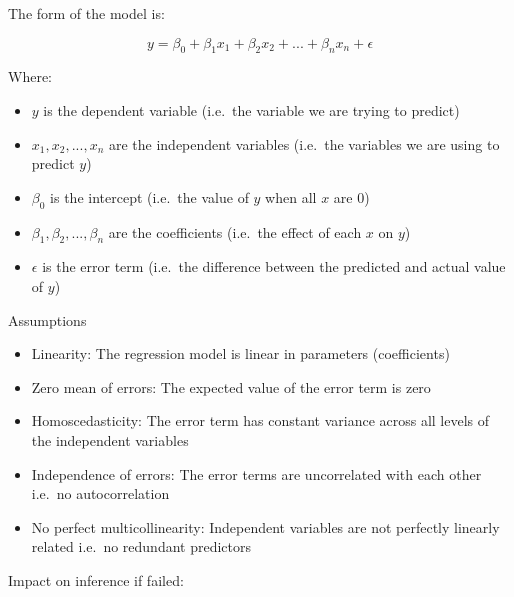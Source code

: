 \documentclass[
  number]{elsarticle}
\begin{document}
\begin{tcolorbox}[enhanced jigsaw, colframe=quarto-callout-caution-color-frame, opacityback=0, breakable, toptitle=1mm, titlerule=0mm, coltitle=black, colback=white, bottomtitle=1mm, left=2mm, arc=.35mm, leftrule=.75mm, opacitybacktitle=0.6, bottomrule=.15mm, colbacktitle=quarto-callout-caution-color!10!white, title=\textcolor{quarto-callout-caution-color}{\faFire}\hspace{0.5em}{Further Information on Linear Regression / OLS}, rightrule=.15mm, toprule=.15mm]

The form of the model is:

\[
y = \beta_0 + \beta_1 x_1 + \beta_2 x_2 + ... + \beta_n x_n + \epsilon\]

Where:

\begin{itemize}
\item
  \(y\) is the dependent variable (i.e.~the variable we are trying to
  predict)
\item
  \(x_1, x_2, ..., x_n\) are the independent variables (i.e.~the
  variables we are using to predict \(y\))
\item
  \(\beta_0\) is the intercept (i.e.~the value of \(y\) when all \(x\)
  are 0)
\item
  \(\beta_1, \beta_2, ..., \beta_n\) are the coefficients (i.e.~the
  effect of each \(x\) on \(y\))
\item
  \(\epsilon\) is the error term (i.e.~the difference between the
  predicted and actual value of \(y\))
\end{itemize}

Assumptions

\begin{itemize}
\item
  Linearity: The regression model is linear in parameters (coefficients)
\item
  Zero mean of errors: The expected value of the error term is zero
\item
  Homoscedasticity: The error term has constant variance across all
  levels of the independent variables
\item
  Independence of errors: The error terms are uncorrelated with each
  other i.e.~no autocorrelation
\item
  No perfect multicollinearity: Independent variables are not perfectly
  linearly related i.e.~no redundant predictors
\end{itemize}

Impact on inference if failed:


\end{tcolorbox}
\end{document}
